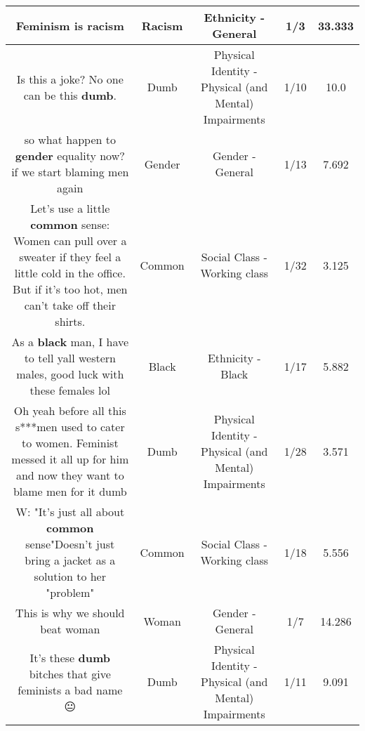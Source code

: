 \documentclass[11pt]{article}
\newlength\mylength
\begin{document}
\begin{center}
\begin{longtable}{|C{.65\mylength}|C{.30\mylength}|C{.12\mylength}|C{.12\mylength}|C{.12\mylength}|}
  \small Feminism is racism\normalsize   & Racism & Ethnicity - General & 1/3 & 33.333 \\  \hline
  \small Is this a joke? No one can be this \textbf{dumb}.\normalsize   & Dumb & Physical Identity - Physical (and Mental) Impairments & 1/10 & 10.0 \\  \hline
  \small so what happen to \textbf{gender} equality now? if we start blaming men again\normalsize   & Gender & Gender - General & 1/13 & 7.692 \\  \hline
  \small Let's use a little \textbf{common} sense:  Women can pull over a sweater if they feel a little cold in the office. But if it's too hot, men can't take off their shirts.\normalsize   & Common & Social Class - Working class & 1/32 & 3.125 \\  \hline
  \small As a \textbf{black} man, I have to tell yall western males, good luck with these females lol\normalsize   & Black & Ethnicity - Black & 1/17 & 5.882 \\  \hline
  \small Oh yeah before all this s***men used to cater to women. Feminist messed it all up for him and now they want to blame men for it dumb\normalsize   & Dumb & Physical Identity - Physical (and Mental) Impairments & 1/28 & 3.571 \\  \hline
  \small W: "It's just all about \textbf{common} sense"Doesn't just bring a jacket as a solution to her "problem"\normalsize   & Common & Social Class - Working class & 1/18 & 5.556 \\  \hline
  \small This is why we should beat woman\normalsize   & Woman & Gender - General & 1/7 & 14.286 \\  \hline
  \small It's these \textbf{dumb} bitches that give feminists a bad name 😐\normalsize   & Dumb & Physical Identity - Physical (and Mental) Impairments & 1/11 & 9.091 \\  \hline

\end{longtable}
\end{center}
\end{document}
